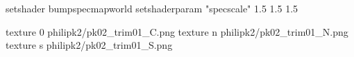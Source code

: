 setshader bumpspecmapworld
setshaderparam "specscale" 1.5 1.5 1.5

texture 0 philipk2/pk02_trim01_C.png
texture n philipk2/pk02_trim01_N.png
texture s philipk2/pk02_trim01_S.png

